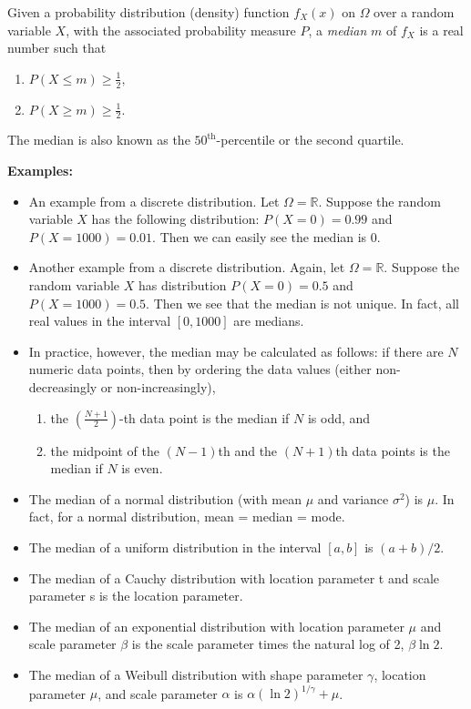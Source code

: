 \documentclass[12pt]{article}
\begin{document}
Given a probability distribution (density) function $f_X(x)$ on $\Omega$ over a random variable $X$, with the associated probability measure $P$, a \emph{median} $m$ of $f_X$ is a real number such that 
\begin{enumerate}
\item
$P(X\leq m)\geq \frac{1}{2},$
\item
$P(X\geq m)\geq \frac{1}{2}.$
\end{enumerate}

The median is also known as the $50^{\text{th}}$-percentile or the second quartile.

\textbf{Examples:}
\begin{itemize}
\item
An example from a discrete distribution.  Let $\Omega=\mathbb{R}$.  Suppose the random variable $X$ has the following distribution: $P(X=0)=0.99$ and $P(X=1000)=0.01$.  Then we can easily see the median is 0.
\item
Another example from a discrete distribution.  Again, let $\Omega=\mathbb{R}$.  Suppose the random variable $X$ has distribution $P(X=0)=0.5$ and $P(X=1000)=0.5$.  Then we see that the median is not unique.  In fact, all real values in the interval $[0,1000]$ are medians.
\item
In practice, however, the median may be calculated as follows: if there are $N$ numeric data points, then by ordering the data values (either non-decreasingly or non-increasingly), 
\begin{enumerate}
\item
the $(\frac{N+1}{2})$-th data point is the median if $N$ is odd, and 
\item
the midpoint of the $(N-1)$th and the $(N+1)$th data points is the median if $N$ is even.
\end{enumerate}
\item
The median of a normal distribution (with mean $\mu$ and variance $\sigma^2$) is $\mu$.  In fact, for a normal distribution, mean = median = mode.
\item
The median of a uniform distribution in the interval $[a,b]$ is $(a+b)/2$.
\item
The median of a Cauchy distribution with location parameter t and scale parameter s is the location parameter.
\item
The median of an exponential distribution with location parameter $\mu$ and scale parameter $\beta$ is the scale parameter times the natural log of 2, $\beta\operatorname{ln}2$.
\item
The median of a Weibull distribution with shape parameter $\gamma$, location parameter $\mu$, and scale parameter $\alpha$ is $\alpha(\operatorname{ln}2)^{1/\gamma}+\mu$.
\end{itemize}
\end{document}

